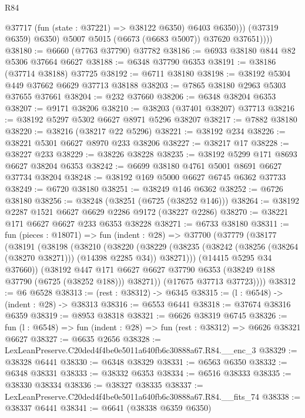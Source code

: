 \begin{lexlean}{R84}
\begin{coremodule}
                  @37717 (fun (state : @37221) => @38122 @6350) @6403 @6350)))
              (@37319 @6359)
              @6350)
            @5007
            @5015
            (@6673 (@6683 @5007))
            @37620
            @37651))))
@38180 := @6660 (@7763 @37790) @37782
@38186 := @6933 @38180 @844 @82 @5306 @37664 @6627
@38188 := @6348 @37790 @6353
@38191 := @38186 (@37714 @38188) @37725
@38192 := @6711 @38180
@38198 := @38192 @5304 @449 @37662 @6629 @37713 @38188
@38203 := @7865 @38180 @2963 @5303 @37655 @37661
@38204 := @232 @37660
@38206 := @6348 @38204 @6353
@38207 := @9171 @38206
@38210 := @38203 (@37401 @38207) @37713
@38216 := @38192 @5297 @5302 @6627 @8971 @5296 @38207
@38217 := @7882 @38180
@38220 := @38216 (@38217 @22 @5296)
@38221 := @38192 @234
@38226 := @38221 @5301 @6627 @8970 @233 @38206
@38227 := @38217 @17
@38228 := @38227 @233
@38229 := @38226 @38228
@38235 := @38192 @5299 @171 @8693 @6627 @38204 @6353
@38242 := @6699 @38180 @4761 @5001 @8691 @6627 @37734 @38204
@38248 := @38192 @169 @5000 @6627 @6745 @6362 @37733
@38249 := @6720 @38180
@38251 := @38249 @146 @6362
@38252 := @6726 @38180
@38256 := @38248 (@38251 (@6725 (@38252 @146)))
@38264 := @38192 @2287 @1521 @6627 @6629 @2286 @9172 (@38227 @2286)
@38270 := @38221 @171 @6627 @6627 @233 @6353 @38228
@38271 := @6733 @38180
@38311 := fun (pieces : @18071) =>
  fun (indent : @28) =>
  @37700
    (@37779
      (@38177
        (@38191
          (@38198
            (@38210
              (@38220
                (@38229
                  (@38235 (@38242 (@38256 (@38264 (@38270 @38271))) (@14398 @2285 @34)) @38271)))
              (@14415 @5295 @34 @37660))
            (@38192
              @447
              @171
              @6627
              @6627
              @37790
              @6353
              (@38249 @188 @37790 (@6725 (@38252 @188)))
              @38271))
          (@17675 @37713 @37723))))
@38312 := @6 @6528
@38313 := (rest : @38312) -> @6345
@38315 := (l : @6548) -> (indent : @28) -> @38313
@38316 := @6553 @6441
@38318 := @37674 @38316 @6359
@38319 := @8953 @38318
@38321 := @6626 @38319 @6745
@38326 := fun (l : @6548) => fun (indent : @28) => fun (rest : @38312) => @6626 @38321 @6627
@38327 := @6635 @2656
@38328 := LexLeanPreserve.C20ded4f4be0e5011a640fb6c30888a67.R84.__enc_3
@38329 := @38328 @6441
@38330 := @6348 @38329
@38331 := @6563 @6350
@38332 := @6348 @38331
@38333 := @38332 @6353
@38334 := @6516 @38333
@38335 := @38330 @38334
@38336 := @38327 @38335
@38337 := LexLeanPreserve.C20ded4f4be0e5011a640fb6c30888a67.R84.__fits_74
@38338 := @38337 @6441
@38341 := @6641 (@38338 @6359 @6350)

\end{coremodule}
\end{lexlean}
